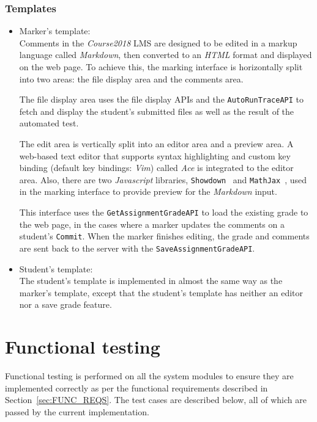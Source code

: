 \subsubsection{Templates}
    \begin{itemize}
        \item Marker's template: \\
        Comments in the \emph{Course2018} LMS are designed to be edited in
        a markup language called \emph{Markdown}, then converted to an
        \emph{HTML} format and displayed on the web page.
        To achieve this, the marking interface is horizontally
        split into two areas: the file display area and the comments area.

        The file display area uses the file display APIs and the 
        \texttt{AutoRunTraceAPI}
        to fetch and display the student's submitted files as well
        as the result of the automated test.

        The edit area is vertically split into an editor area and a
        preview area. A web-based text editor that supports syntax highlighting
        and custom key binding (default key bindings: \emph{Vim})
        called \emph{Ace} \cite{aceEditor} is integrated to the editor area.
        Also, there are two \emph{Javascript} libraries,
        \texttt{Showdown}~\cite{showdown} and \texttt{MathJax}~\cite{mathjax},
        used in the marking interface to provide preview for the \emph{Markdown}
        input.

        This interface uses the \texttt{GetAssignmentGradeAPI} to load the
        existing grade to the web page, in the cases where a marker updates
        the comments on a student's \texttt{Commit}. When the marker finishes
        editing, the grade and comments are sent back to the server with the
        \texttt{SaveAssignmentGradeAPI}.

        \item Student's template: \\
        The student's template is implemented in almost the same way as the
        marker's template, except that the student's template has neither an
        editor nor a save grade feature.
    \end{itemize}


\section{Functional testing}
Functional testing is performed on all the system modules to ensure they are
implemented correctly as per the functional requirements described in
Section~\ref{sec:FUNC_REQS}. 
The test cases are described below, all of which are passed by the current
implementation.

